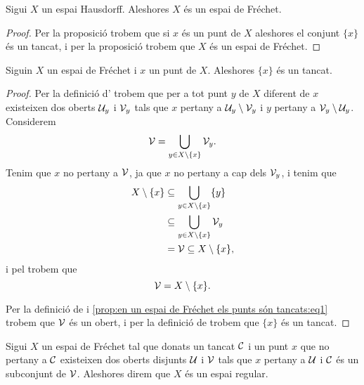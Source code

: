 \documentclass[../Apunts.tex]{subfiles}
\begin{document}
	\begin{corollary}
		\label{cor:els espais Hausdorff són Fréchet}
		Sigui \(X\) un espai Hausdorff. Aleshores \(X\) és un espai de Fréchet.
		\begin{proof}
			Per la proposició  trobem que si \(x\) és un punt de \(X\) aleshores el conjunt \(\{x\}\) és un tancat, i per la proposició  trobem que \(X\) és un espai de Fréchet.
		\end{proof}
	\end{corollary}
	\begin{proposition}
		\label{prop:en un espai de Fréchet els punts són tancats}
		Siguin \(X\) un espai de Fréchet i \(x\) un punt de \(X\). Aleshores \(\{x\}\) és un tancat.
		\begin{proof}
			Per la definició d' trobem que per a tot punt \(y\) de \(X\) diferent de \(x\) existeixen dos oberts \(\mathcal{U}_{y}\) i \(\mathcal{V}_{y}\) tals que \(x\) pertany a \(\mathcal{U}_{y}\setminus\mathcal{V}_{y}\) i \(y\) pertany a \(\mathcal{V}_{y}\setminus\mathcal{U}_{y}\). Considerem
			\begin{equation}
				\label{prop:en un espai de Fréchet els punts són tancats:eq1}
				\mathcal{V}=\bigcup_{y\in X\setminus\{x\}}\mathcal{V}_{y}.
			\end{equation}
			Tenim que \(x\) no pertany a \(\mathcal{V}\), ja que \(x\) no pertany a cap dels \(\mathcal{V}_{y}\), i tenim que
			\begin{align*}
				X\setminus\{x\}&\subseteq\bigcup_{y\in X\setminus\{x\}}\{y\} \\
				&\subseteq\bigcup_{y\in X\setminus\{x\}}\mathcal{V}_{y}\\
				&=\mathcal{V}\subseteq X\setminus\{x\},
			\end{align*}
			i pel  trobem que
			\[\mathcal{V}=X\setminus\{x\}.\]
			
			Per la definició de  i \eqref{prop:en un espai de Fréchet els punts són tancats:eq1} trobem que \(\mathcal{V}\) és un obert, i per la definició de   trobem que \(\{x\}\) és un tancat.
		\end{proof}
	\end{proposition}
	\begin{definition}
		\label{def:espai regular}
		Sigui \(X\) un espai de Fréchet tal que donats un tancat \(\mathcal{C}\) i un punt \(x\) que no pertany a \(\mathcal{C}\) existeixen dos oberts disjunts \(\mathcal{U}\) i \(\mathcal{V}\) tals que \(x\) pertany a \(\mathcal{U}\) i \(\mathcal{C}\) és un subconjunt de \(\mathcal{V}\). Aleshores direm que \(X\) és un espai regular.
	\end{definition}
\end{document}
